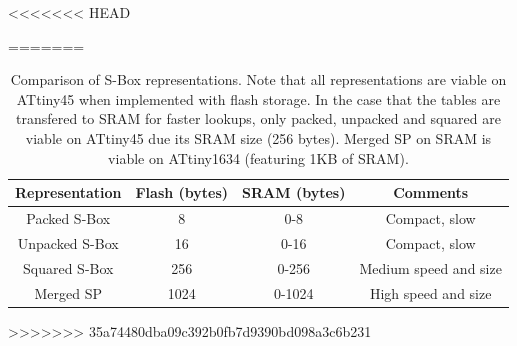 \documentclass[11pt]{article}
\begin{document}
<<<<<<< HEAD
 

=======
\begin{table}[h]
\footnotesize
\centering
\begin{tabular}{| c | c  | c | c | }
\hline
  Representation & Flash (bytes) & SRAM (bytes) & Comments  \\
\hline
  Packed S-Box & 8  & 0-8 & Compact, slow   \\
 \hline
  Unpacked S-Box & 16  & 0-16 & Compact, slow   \\
\hline
  Squared S-Box & 256  & 0-256 & Medium speed and size   \\
 \hline
  Merged SP & 1024  & 0-1024 & High speed and size  \\
 

\hline
\end{tabular}
\caption{\footnotesize Comparison of S-Box representations. Note that all representations are viable on ATtiny45 when implemented with flash storage. In the case that the tables are transfered to SRAM for faster lookups, only packed, unpacked and squared are viable on ATtiny45 due its SRAM size (256 bytes). Merged SP on SRAM is viable on ATtiny1634 (featuring 1KB of SRAM). }
\end{table}
>>>>>>> 35a74480dba09c392b0fb7d9390bd098a3c6b231
\end{document}
